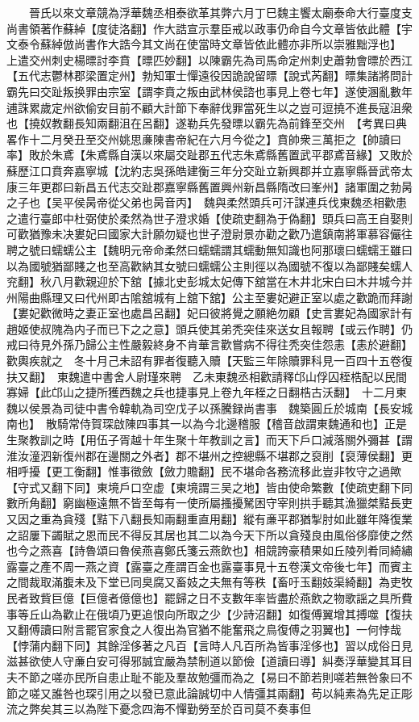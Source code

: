 　　晉氏以來文章競為浮華魏丞相泰欲革其弊六月丁巳魏主饗太廟泰命大行臺度支尚書領著作蘇綽【度徒洛翻】作大誥宣示羣臣戒以政事仍命自今文章皆依此體【宇文泰令蘇綽倣尚書作大誥今其文尚在使當時文章皆依此體亦非所以崇雅黜浮也】　上遣交州刺史楊㬓討李賁【㬓匹妙翻】以陳霸先為司馬命定州刺史蕭勃會㬓於西江【五代志鬱林郡梁置定州】勃知軍士憚遠役因詭說留㬓【說式芮翻】㬓集諸將問計霸先曰交趾叛换罪由宗室【謂李賁之叛由武林侯諮也事見上卷七年】遂使溷亂數年逋誅累歲定州欲偷安目前不顧大計節下奉辭伐罪當死生以之豈可逗撓不進長寇沮衆也【撓奴教翻長知兩翻沮在呂翻】遂勒兵先發㬓以霸先為前鋒至交州　【考異曰典畧作十二月癸丑至交州姚思亷陳書帝紀在六月今從之】賁帥衆三萬拒之【帥讀曰率】敗於朱鳶【朱鳶縣自漢以來屬交趾郡五代志朱鳶縣舊置武平郡鳶音緣】又敗於蘇歷江口賁奔嘉寧城【沈約志吳孫皓建衡三年分交趾立新興郡并立嘉寧縣晉武帝太康三年更郡曰新昌五代志交趾郡嘉寧縣舊置興州新昌縣隋改曰峯州】諸軍圍之勃昺之子也【吴平侯昺帝從父弟也昺音丙】　魏與柔然頭兵可汗謀連兵伐東魏丞相歡患之遣行臺郎中杜弼使於柔然為世子澄求婚【使疏吏翻為于偽翻】頭兵曰高王自娶則可歡猶豫未决婁妃曰國家大計願勿疑也世子澄尉景亦勸之歡乃遣鎮南將軍慕容儼往聘之號曰蠕蠕公主【魏明元帝命柔然曰蠕蠕謂其蠕動無知識也阿那瓌曰蠕蠕王雖曰以為國號猶鄙賤之也至高歡納其女號曰蠕蠕公主則徑以為國號不復以為鄙賤矣蠕人兖翻】秋八月歡親迎於下舘【據北史彭城太妃傳下舘當在木井北宋白曰木井城今并州陽曲縣理又曰代州即古隂舘城有上舘下舘】公主至婁妃避正室以處之歡跪而拜謝【婁妃歡微時之妻正室也處昌呂翻】妃曰彼將覺之願絶勿顧【史言婁妃為國家計有趙姬使叔隗為内子而已下之之意】頭兵使其弟秃突佳來送女且報聘【或云作聘】仍戒曰待見外孫乃歸公主性嚴毅終身不肯華言歡嘗病不得往秃突佳怨恚【恚於避翻】歡輿疾就之　冬十月己未詔有罪者復聽入贖【天監三年除贖罪科見一百四十五卷復扶又翻】　東魏遣中書舍人尉瑾來聘　乙未東魏丞相歡請釋邙山俘囚桎梏配以民間寡婦【此邙山之捷所獲西魏之兵也捷事見上卷九年桎之日翻梏古沃翻】　十二月東魏以侯景為司徒中書令韓軌為司空戊子以孫騰録尚書事　魏築圓丘於城南【長安城南也】　散騎常侍賀琛啟陳四事其一以為今北邊稽服【稽音啟謂東魏通和也】正是生聚教訓之時【用伍子胥越十年生聚十年教訓之言】而天下戶口減落關外彌甚【謂淮汝潼泗新復州郡在邊關之外者】郡不堪州之控總縣不堪郡之裒削【裒薄侯翻】更相呼擾【更工衡翻】惟事徵斂【斂力贍翻】民不堪命各務流移此豈非牧守之過歟【守式又翻下同】東境戶口空虚【東境謂三吴之地】皆由使命繁數【使疏吏翻下同數所角翻】窮幽極遠無不皆至每有一使所屬搔擾駑困守宰則拱手聽其漁獵桀黠長吏又因之重為貪殘【黠下八翻長知兩翻重直用翻】縱有亷平郡猶掣肘如此雖年降復業之詔屢下蠲賦之恩而民不得反其居也其二以為今天下所以貪殘良由風俗侈靡使之然也今之燕喜【詩魯頌曰魯侯燕喜鄭氏箋云燕飲也】相競誇豪積果如丘陵列肴同綺繡露臺之產不周一燕之資【露臺之產謂百金也露臺事見十五卷漢文帝後七年】而賓主之間裁取滿腹未及下堂已同臭腐又畜妓之夫無有等秩【畜吁玉翻妓渠綺翻】為吏牧民者致貲巨億【巨億者億億也】罷歸之日不支數年率皆盡於燕飲之物歌謡之具所費事等丘山為歡止在俄頃乃更追恨向所取之少【少詩沼翻】如復傅翼增其搏噬【復扶又翻傅讀曰附言罷官家食之人復出為官猶不能奮飛之鳥復傅之羽翼也】一何悖哉【悖蒲内翻下同】其餘淫侈著之凡百【言時人凡百所為皆事淫侈也】習以成俗日見滋甚欲使人守亷白安可得邪誠宜嚴為禁制道以節儉【道讀曰導】糾奏浮華變其耳目夫不節之嗟亦民所自患止耻不能及羣故勉彊而為之【易曰不節若則嗟若無咎象曰不節之嗟又誰咎也琛引用之以發已意此論誠切中人情彊其兩翻】苟以純素為先足正彫流之弊矣其三以為陛下憂念四海不憚勤勞至於百司莫不奏事但